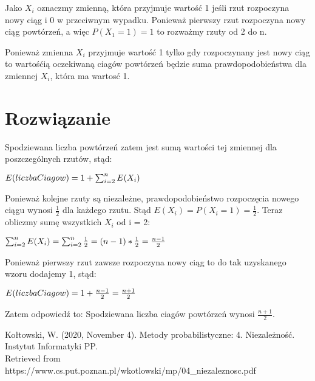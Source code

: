 \documentclass[12pt,oneside,a4paper]{book} %
\theoremstyle{break}
\begin{document}
Jako $X_i$ oznaczmy zmienną, która przyjmuje wartość 1 jeśli rzut rozpoczyna nowy ciąg i 0 w przeciwnym wypadku. Ponieważ pierwszy rzut rozpoczyna nowy ciąg powtórzeń, a więc $P(X_1=1)=1$ to rozważmy rzuty od 2 do n. 

Ponieważ zmienna $X_i$ przyjmuje wartość 1 tylko gdy rozpoczynany jest nowy ciąg to wartośćią oczekiwaną ciagów powtórzeń będzie suma prawdopodobieństwa dla zmiennej $X_i$, która ma wartosć 1.



\chapter*{Rozwiązanie}

Spodziewana liczba powtórzeń zatem jest sumą wartości tej zmiennej dla poszczególnych rzutów, stąd:

\begin{math}
  \centering
  E(liczbaCiagow) = 1 + \sum_{i=2}^{n}E(X_i)
\end{math}

Ponieważ kolejne rzuty są niezależne, prawdopodobieństwo rozpoczęcia nowego ciągu wynosi $\frac{1}{2}$ dla każdego rzutu. Stąd $E(X_i)=P(X_i=1)=\frac{1}{2}$. Teraz obliczmy sumę wszystkich $X_i$ od i = 2:

\begin{math}
  \centering
  \sum_{i=2}^{n}E(X_i) = \sum_{i=2}^{n}\frac{1}{2} = (n-1)*\frac{1}{2} = \frac{n-1}{2}
\end{math}

Ponieważ pierwszy rzut zawsze rozpoczyna nowy ciąg to do tak uzyskanego wzoru dodajemy 1, stąd:

\begin{math}
  \centering
  E(liczbaCiagow) = 1 + \frac{n-1}{2} = \frac{n+1}{2}
\end{math}

Zatem odpowiedź to: Spodziewana liczba ciagów powtórzeń wynosi $\frac{n+1}{2}$.

\begin{thebibliography}{00}
  Kołtowski, W. (2020, November 4). Metody probabilistyczne: 4. Niezależność. Instytut Informatyki PP.\\ Retrieved from https://www.cs.put.poznan.pl/wkotlowski/mp/04\_niezaleznosc.pdf
\end{thebibliography}
\end{document}
